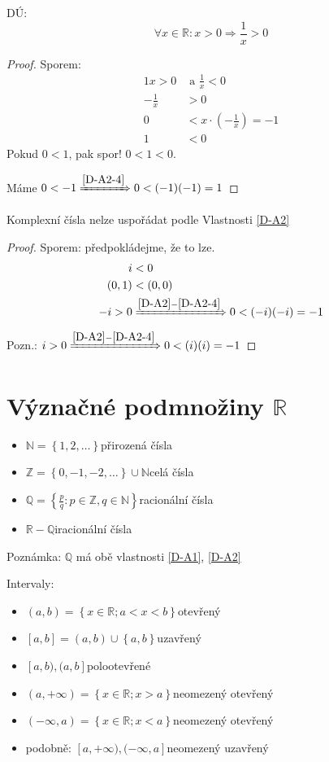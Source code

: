 DÚ:
\begin{equation}
	\forall x \in \mathbb{R}: x>0 \Rightarrow \frac{1}{x}>0
\end{equation}
\begin{proof}
	Sporem:
	\begin{alignat*}{1}
		x>0 &\text{ a } \frac{1}{x}<0 \\
		-\frac{1}{x}&>0 \\
		0&<x\cdot\left(-\frac{1}{x}\right) = -1 \\
		1 &< 0
	\end{alignat*}
	Pokud $0<1$, pak spor! $0<1<0$.

	Máme $0<-1 \xRightarrow{\ref{D-A2-4}} 0<(-1)(-1) = 1$
\end{proof}

\begin{example}
	Komplexní čísla nelze uspořádat podle Vlastnosti \ref{D-A2}
\end{example}
\begin{proof}
	Sporem: předpokládejme, že to lze.
	\begin{alignat*}{1}
		i&<0 \\
		(0,1)&<(0,0) \\
		-i>0 &\xRightarrow{\ref*{D-A2}-\ref{D-A2-4}} 0<(-i)(-i) = -1
	\end{alignat*}
	Pozn.: $i>0 \xRightarrow{\ref*{D-A2}-\ref{D-A2-4}} 0<(i)(i) = -1$
\end{proof}

\section{Význačné podmnožiny \texorpdfstring{$\mathbb{R}$}{R}}
\begin{itemize}
	\item $\mathbb{N} = \left\{1,2,\dots\right\}$\quad přirozená čísla
	\item $\mathbb{Z} = \left\{0,-1,-2,\dots\right\}\cup\mathbb{N}$\quad celá čísla
	\item $\mathbb{Q} = \left\{\frac{p}{q}: p\in\mathbb{Z}, q\in\mathbb{N}\right\}$\quad racionální čísla
	\item $\mathbb{R} - \mathbb{Q}$\quad iracionální čísla
\end{itemize}

Poznámka: $\mathbb{Q}$ má obě vlastnosti \ref{D-A1}, \ref{D-A2}

Intervaly:
\begin{itemize}
	\item $(a,b) = \left\{x\in\mathbb{R}; a<x<b\right\}$\quad otevřený
	\item $[a,b] = (a,b)\cup\left\{a,b\right\}$\quad uzavřený
	\item $[a,b), (a,b]$\quad polootevřené
	\item $(a,+\infty) = \left\{x\in\mathbb{R}; x>a\right\}$\quad neomezený otevřený
	\item $(-\infty, a) = \left\{x\in\mathbb{R}; x<a\right\}$\quad neomezený otevřený
	\item podobně: $[a, +\infty), (-\infty, a]$\quad neomezený uzavřený
\end{itemize}


